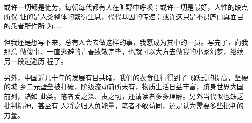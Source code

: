 或许一切都是徒劳，每朝每代都有人在旷野中呼唤；或许一切是最好，人性的缺点所保
证的是人类整体的繁衍生息，代代基因的传递；或许这只是不识庐山真面目的愚者所作所
为……

但我还是想写下来，总有人会去做这样的事，我愿成为其中的一员。写完了，向我那总
做傻事、一直逃避的青春致敬完毕，也就可以大方去做我的小家幻梦，继续另一段逃避历
程了。

另外，中国近几十年的发展有目共睹，我们的衣食住行得到了飞跃式的提高，坚硬的城
乡二元壁垒被打破，阶级流动前所未有，物质生活日益丰富，跻身世界大国前列，诸如
此类。笔者爱之深、责之切，还请读者多多理解。另外当代似也缺乏批判精神，甚至有
人将之归入负能量，笔者不敢苟同，还是认为需要多些批判的力量。













